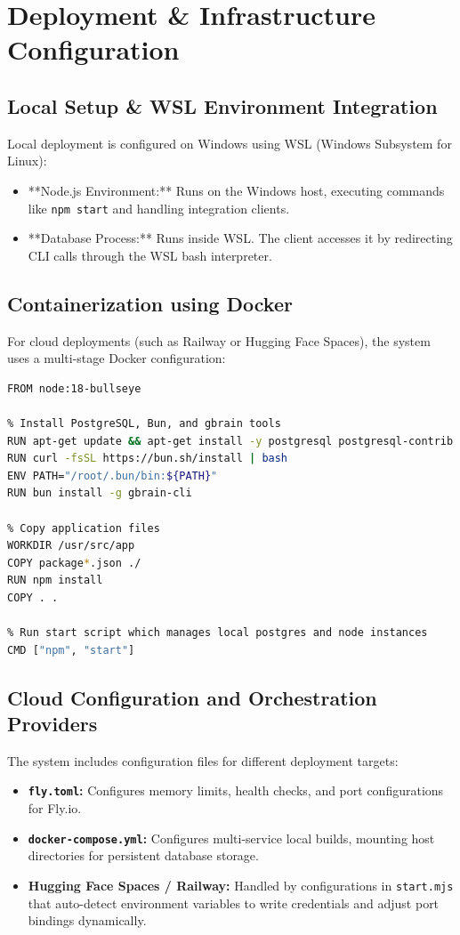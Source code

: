 \documentclass[12pt,a4paper]{report}
\begin{document}
\chapter{Deployment \& Infrastructure Configuration}
\label{chap:deployment}

\section{Local Setup \& WSL Environment Integration}
Local deployment is configured on Windows using WSL (Windows Subsystem for Linux):
\begin{itemize}
    \item **Node.js Environment:** Runs on the Windows host, executing commands like \texttt{npm start} and handling integration clients.
    \item **Database Process:** Runs inside WSL. The client accesses it by redirecting CLI calls through the WSL bash interpreter.
\end{itemize}

\section{Containerization using Docker}
For cloud deployments (such as Railway or Hugging Face Spaces), the system uses a multi-stage Docker configuration:
\begin{lstlisting}[language=bash, caption=Production Dockerfile highlights]
FROM node:18-bullseye

% Install PostgreSQL, Bun, and gbrain tools
RUN apt-get update && apt-get install -y postgresql postgresql-contrib
RUN curl -fsSL https://bun.sh/install | bash
ENV PATH="/root/.bun/bin:${PATH}"
RUN bun install -g gbrain-cli

% Copy application files
WORKDIR /usr/src/app
COPY package*.json ./
RUN npm install
COPY . .

% Run start script which manages local postgres and node instances
CMD ["npm", "start"]
\end{lstlisting}

\section{Cloud Configuration and Orchestration Providers}
The system includes configuration files for different deployment targets:
\begin{itemize}
    \item \textbf{\texttt{fly.toml}:} Configures memory limits, health checks, and port configurations for Fly.io.
    \item \textbf{\texttt{docker-compose.yml}:} Configures multi-service local builds, mounting host directories for persistent database storage.
    \item \textbf{Hugging Face Spaces / Railway:} Handled by configurations in \texttt{start.mjs} that auto-detect environment variables to write credentials and adjust port bindings dynamically.
\end{itemize}
\end{document}
